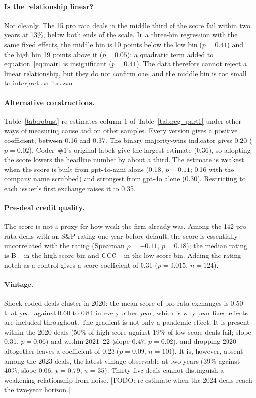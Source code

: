\documentclass[12pt]{article}
\begin{document}


\paragraph{Is the relationship linear?} Not cleanly. The 15 pro rata deals in the middle third of the score fail within two years at 13\%, below both ends of the scale. In a three-bin regression with the same fixed effects, the middle bin is 10 points below the low bin ($p = 0.41$) and the high bin 19 points above it ($p = 0.05$); a quadratic term added to equation~\eqref{eq:main} is insignificant ($p = 0.41$). The data therefore cannot reject a linear relationship, but they do not confirm one, and the middle bin is too small to interpret on its own.

\paragraph{Alternative constructions.} Table~\ref{tab:robust} re-estimates column 1 of Table~\ref{tab:reg_part1} under other ways of measuring cause and on other samples. Every version gives a positive coefficient, between 0.16 and 0.37. The binary majority-wins indicator gives 0.20 ($p = 0.02$). Coder~\#1's original labels give the largest estimate (0.36), so adopting the score lowers the headline number by about a third. The estimate is weakest when the score is built from gpt-4o-mini alone (0.18, $p = 0.11$; 0.16 with the company name scrubbed) and strongest from gpt-4o alone (0.30). Restricting to each issuer's first exchange raises it to 0.35.



\paragraph{Pre-deal credit quality.} The score is not a proxy for how weak the firm already was. Among the 142 pro rata deals with an S\&P rating one year before default, the score is essentially uncorrelated with the rating (Spearman $\rho = -0.11$, $p = 0.18$); the median rating is B$-$ in the high-score bin and CCC+ in the low-score bin. Adding the rating notch as a control gives a score coefficient of 0.31 ($p = 0.015$, $n = 124$).

\paragraph{Vintage.} Shock-coded deals cluster in 2020: the mean score of pro rata exchanges is 0.50 that year against 0.60 to 0.84 in every other year, which is why year fixed effects are included throughout. The gradient is not only a pandemic effect. It is present within the 2020 deals (50\% of high-score against 19\% of low-score deals fail; slope 0.31, $p = 0.06$) and within 2021--22 (slope 0.47, $p = 0.02$), and dropping 2020 altogether leaves a coefficient of 0.23 ($p = 0.09$, $n = 101$). It is, however, absent among the 2023 deals, the latest vintage observable at two years (39\% against 40\%; slope 0.06, $p = 0.79$, $n = 35$). Thirty-five deals cannot distinguish a weakening relationship from noise. [TODO: re-estimate when the 2024 deals reach the two-year horizon.]
\end{document}
